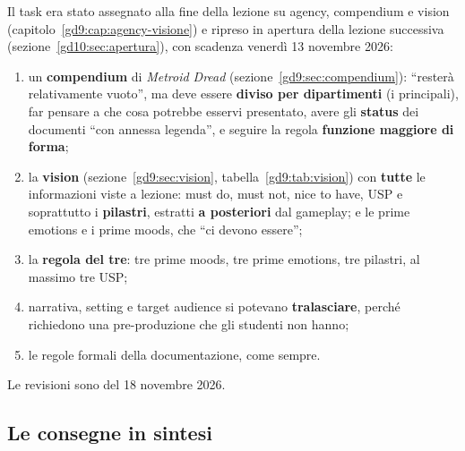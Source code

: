 Il task era stato assegnato alla fine della lezione su agency, compendium e
vision (capitolo~\ref{gd9:cap:agency-visione}) e ripreso in apertura della
lezione successiva (sezione~\ref{gd10:sec:apertura}), con scadenza venerdì 13
novembre 2026:
\begin{enumerate}
  \item un \textbf{compendium} di \emph{Metroid Dread}
        (sezione~\ref{gd9:sec:compendium}): ``resterà relativamente vuoto'',
        ma deve essere \textbf{diviso per dipartimenti} (i principali), far
        pensare a che cosa potrebbe esservi presentato, avere gli
        \textbf{status} dei documenti ``con annessa legenda'', e seguire la
        regola \textbf{funzione maggiore di forma};
  \item la \textbf{vision} (sezione~\ref{gd9:sec:vision},
        tabella~\ref{gd9:tab:vision}) con \textbf{tutte} le informazioni
        viste a lezione: must do, must not, nice to have, USP e soprattutto i
        \textbf{pilastri}, estratti \textbf{a posteriori} dal gameplay; e le
        prime emotions e i prime moods, che ``ci devono essere'';
  \item la \textbf{regola del tre}: tre prime moods, tre prime emotions, tre
        pilastri, al massimo tre USP;
  \item narrativa, setting e target audience si potevano
        \textbf{tralasciare}, perché richiedono una pre-produzione che gli
        studenti non hanno;
  \item le regole formali della documentazione, come sempre.
\end{enumerate}
Le revisioni sono del 18 novembre 2026.

\subsection{Le consegne in sintesi}

